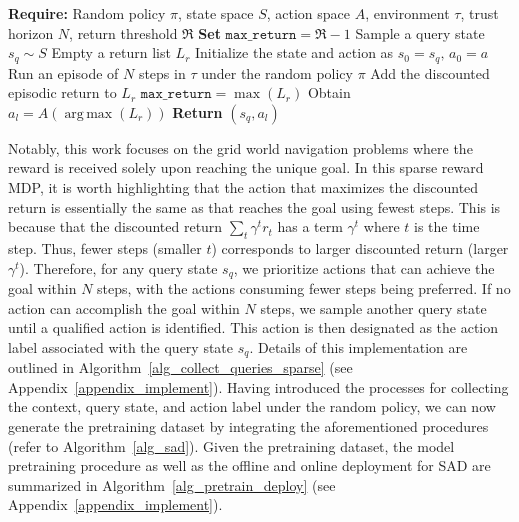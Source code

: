 \documentclass[10pt]{article}
\DeclareMathOperator*{\argmax}{arg\,max}
\begin{document}
\begin{algorithm}
\caption{Collecting Query States and Action Labels under Random Policy (MDP)}
\label{alg_collect_queries_dense}
\begin{algorithmic}[1]
		\STATE \textbf{Require:} Random policy $\pi$, state space $S$, action space $A$, environment $\tau$, trust horizon $N$, return threshold $\mathfrak{R}$
        \STATE \textbf{Set} $\texttt{max\_return} = \mathfrak{R} - 1$
            \STATE Sample a query state $s_q \sim S$
            \STATE Empty a return list $L_r$
                \STATE Initialize the state and action as $s_0 = s_q, \, a_0 = a$
                \STATE Run an episode of $N$ steps in $\tau$ under the random policy $\pi$
            \STATE Add the discounted episodic return to $L_r$
            \ENDFOR
            \STATE $\texttt{max\_return} = \max (L_r)$
        \ENDWHILE
            \STATE Obtain $a_l = A(\argmax (L_r))$
        \STATE \textbf{Return} $(s_q, a_l)$
\end{algorithmic}
\end{algorithm}
Notably, this work focuses on the grid world navigation problems where the reward is received solely upon reaching the unique goal. In this sparse reward MDP, it is worth highlighting that the action that maximizes the discounted return is essentially the same as that reaches the goal using fewest steps. This is because that the discounted return $\sum_t \gamma^t r_t$ has a term $\gamma^t$ where $t$ is the time step. Thus, fewer steps (smaller $t$) corresponds to larger discounted return (larger $\gamma^t$). Therefore, for any query state $s_q$, we prioritize actions that can achieve the goal within $N$ steps, with the actions consuming fewer steps being preferred. If no action can accomplish the goal within $N$ steps, we sample another query state until a qualified action is identified. This action is then designated as the action label associated with the query state $s_q$. Details of this implementation are outlined in Algorithm~\ref{alg_collect_queries_sparse} (see Appendix~\ref{appendix_implement}).
Having introduced the processes for collecting the context, query state, and action label under the random policy, we can now generate the pretraining dataset by integrating the aforementioned procedures (refer to Algorithm~\ref{alg_sad}).
Given the pretraining dataset, the model pretraining procedure as well as the offline and online deployment for SAD are summarized in Algorithm~\ref{alg_pretrain_deploy} (see Appendix~\ref{appendix_implement}).
\end{document}

